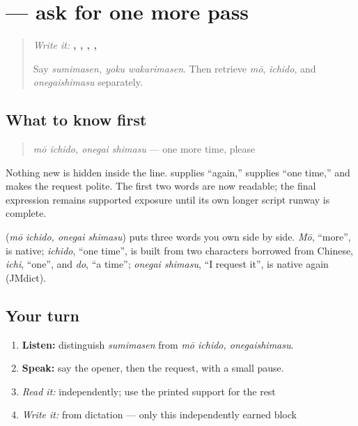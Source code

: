 \section[\texorpdfstring{\ja{もういちど、おねがいします} (mō ichido …)}{もういちど、おねがいします (mō ichido …)}]{ — ask for one more pass}

\label{lesson:JA-C09-mou-ichido-onegaishimasu}



\begin{quote}
\emph{Write it:} \textbf{, , , , }

Say \emph{sumimasen, yoku wakarimasen}. Then retrieve \emph{mō}, \emph{ichido}, and \emph{onegaishimasu} separately.
\end{quote}

\subsection*{What to know first}
\begin{quote}
\textbf{}
\end{quote}

\begin{quote}
\emph{mō ichido, onegai shimasu} — one more time, please
\end{quote}

Nothing new is hidden inside the line. \textbf{} supplies “again,” \textbf{} supplies “one time,” and \textbf{} makes the request polite. The first two words are now readable; the final expression remains supported exposure until its own longer script runway is complete.

\begin{cousinweb}
\textbf{} (\emph{mō ichido, onegai shimasu}) puts three words you own side by side. \emph{Mō}, \textquotedblleft{}more\textquotedblright{}, is native; \emph{ichido}, \textquotedblleft{}one time\textquotedblright{}, is built from two characters borrowed from Chinese, \emph{ichi}, \textquotedblleft{}one\textquotedblright{}, and \emph{do}, \textquotedblleft{}a time\textquotedblright{}; \emph{onegai shimasu}, \textquotedblleft{}I request it\textquotedblright{}, is native again (JMdict).
\end{cousinweb}

\subsection*{Your turn}
\begin{enumerate}
\raggedright
  \item \textbf{Listen:} distinguish \emph{sumimasen} from \emph{mō ichido, onegaishimasu}.
  \item \textbf{Speak:} say the opener, then the request, with a small pause.
  \item \emph{Read it:} \textbf{} independently; use the printed support for the rest
  \item \emph{Write it:} \textbf{} from dictation — only this independently earned block
\end{enumerate}

